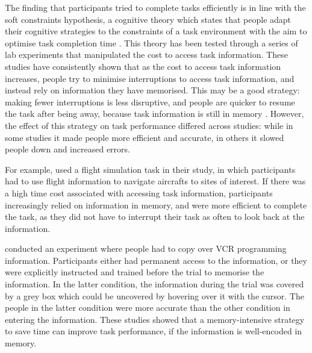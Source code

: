 The finding that participants tried to complete tasks efficiently is in line with the soft constraints hypothesis, a cognitive theory which states that people adapt their cognitive strategies to the constraints of a task environment with the aim to optimise task completion time \citep{Gray2006}. This theory has been tested through a series of lab experiments that manipulated the cost to access task information. These studies have consistently shown that as the cost to access task information increases, people try to minimise interruptions to access task information, and instead rely on information they have memorised. This may be a good strategy: making fewer interruptions is less disruptive, and people are quicker to resume the task after being away, because task information is still in memory \citep{Morgan2009}. However, the effect of this strategy on task performance differed across studies: while in some studies it made people more efficient and accurate, in others it slowed people down and increased errors. 

For example, \citet{Waldron2007} used a flight simulation task in their study, in which participants had to use flight information to navigate aircrafts to sites of interest. If there was a high time cost associated with accessing task information, participants increasingly relied on information in memory, and were more efficient to complete the task, as they did not have to interrupt their task as often to look back at the information. 

\citet{Gray2004} conducted an experiment where people had to copy over VCR programming information. Participants either had permanent access to the information, or they were explicitly instructed and trained before the trial to memorise the information. In the latter condition, the information during the trial was covered by a grey box which could be uncovered by hovering over it with the cursor. The people in the latter condition were more accurate than the other condition in entering the information. These studies showed that a memory-intensive strategy to save time can improve task performance, if the information is well-encoded in memory.

